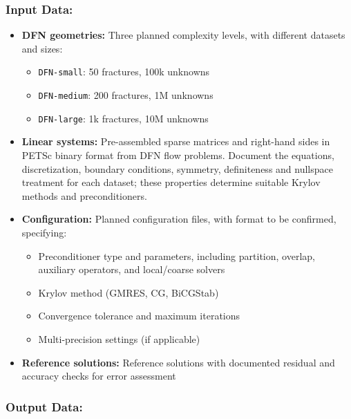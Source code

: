 \subsubsection{Input Data:}
\begin{itemize}
\item \textbf{DFN geometries:} Three planned complexity levels, with different datasets and sizes:
  \begin{itemize}
  \item \texttt{DFN-small}: 50 fractures, 100k unknowns
  \item \texttt{DFN-medium}: 200 fractures, 1M unknowns
  \item \texttt{DFN-large}: 1k fractures, 10M unknowns
  \end{itemize}
  
\item \textbf{Linear systems:} Pre-assembled sparse matrices and right-hand sides in PETSc binary format from DFN flow problems. Document the equations, discretization, boundary conditions, symmetry, definiteness and nullspace treatment for each dataset; these properties determine suitable Krylov methods and preconditioners.

\item \textbf{Configuration:} Planned configuration files, with format to be confirmed, specifying:
  \begin{itemize}
  \item Preconditioner type and parameters, including partition, overlap, auxiliary operators, and local/coarse solvers
  \item Krylov method (GMRES, CG, BiCGStab)
  \item Convergence tolerance and maximum iterations
  \item Multi-precision settings (if applicable)
  \end{itemize}

\item \textbf{Reference solutions:} Reference solutions with documented residual and accuracy checks for error assessment
\end{itemize}

\subsubsection{Output Data:}

